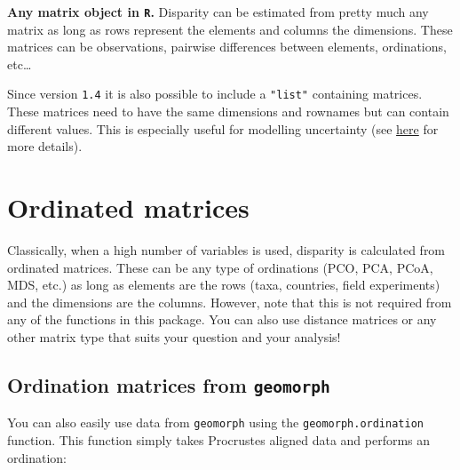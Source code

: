\documentclass[
]{book}
\newenvironment{Shaded}{\begin{snugshade}}{\end{snugshade}}
\newcommand{\CommentTok}[1]{\textcolor[rgb]{0.56,0.35,0.01}{\textit{#1}}}
\newcommand{\DataTypeTok}[1]{\textcolor[rgb]{0.13,0.29,0.53}{#1}}
\newcommand{\DecValTok}[1]{\textcolor[rgb]{0.00,0.00,0.81}{#1}}
\newcommand{\KeywordTok}[1]{\textcolor[rgb]{0.13,0.29,0.53}{\textbf{#1}}}
\newcommand{\NormalTok}[1]{#1}
\newcommand{\OperatorTok}[1]{\textcolor[rgb]{0.81,0.36,0.00}{\textbf{#1}}}
\newcommand{\OtherTok}[1]{\textcolor[rgb]{0.56,0.35,0.01}{#1}}
\newcommand{\StringTok}[1]{\textcolor[rgb]{0.31,0.60,0.02}{#1}}
\begin{document}
\textbf{Any matrix object in \texttt{R}.}
Disparity can be estimated from pretty much any matrix as long as rows represent the elements and columns the dimensions.
These matrices can be observations, pairwise differences between elements, ordinations, etc\ldots{}

Since version \texttt{1.4} it is also possible to include a \texttt{"list"} containing matrices.
These matrices need to have the same dimensions and rownames but can contain different values.
This is especially useful for modelling uncertainty (see \protect\hyperlink{multi.input}{here} for more details).

\hypertarget{ordinated-matrices}{%
\section{Ordinated matrices}\label{ordinated-matrices}}

Classically, when a high number of variables is used, disparity is calculated from ordinated matrices.
These can be any type of ordinations (PCO, PCA, PCoA, MDS, etc.) as long as elements are the rows (taxa, countries, field experiments) and the dimensions are the columns.
However, note that this is not required from any of the functions in this package.
You can also use distance matrices or any other matrix type that suits your question and your analysis!

\hypertarget{ordination-matrices-from-geomorph}{%
\subsection{\texorpdfstring{Ordination matrices from \texttt{geomorph}}{Ordination matrices from geomorph}}\label{ordination-matrices-from-geomorph}}

You can also easily use data from \texttt{geomorph} using the \texttt{geomorph.ordination} function.
This function simply takes Procrustes aligned data and performs an ordination:

\begin{Shaded}
\end{Shaded}
\end{document}
